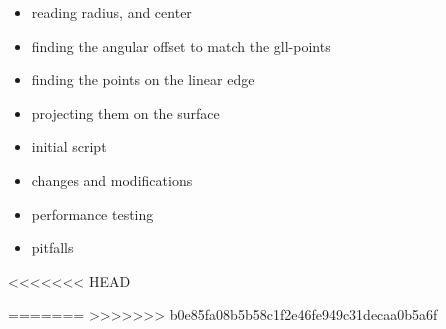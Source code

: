 \begin{itemize}
		\item reading radius, and center
		\item finding the angular offset to match the gll-points
		\item finding the points on the linear edge
		\item projecting them on the surface
\end{itemize}
\begin{itemize}
	\item initial script
	\item changes and modifications
	\item performance testing
	\item pitfalls
\end{itemize}

<<<<<<< HEAD

=======
>>>>>>> b0e85fa08b5b58c1f2e46fe949c31decaa0b5a6f
